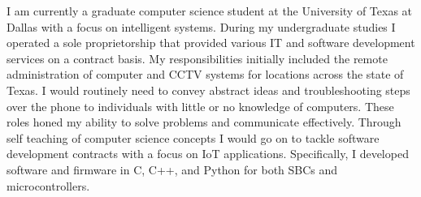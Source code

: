 \begin{cvletter}

	I am currently a graduate computer science student at the University
	of Texas at Dallas with a focus on intelligent systems.
	During my undergraduate studies I operated a sole proprietorship
	that provided various IT and software development services on a
	contract basis.
	My responsibilities initially included
	the remote administration of computer and CCTV systems for locations
	across the state of Texas. I would routinely need to convey abstract
	ideas and troubleshooting steps over the phone to individuals with
	little or no knowledge of computers. These roles honed my ability to
	solve problems and communicate effectively.
	Through self teaching of computer science concepts I would go on
	to tackle software development contracts with a focus on IoT
	applications. Specifically, I developed software and firmware in C,
	C++, and Python for both SBCs and microcontrollers.

\end{cvletter}
